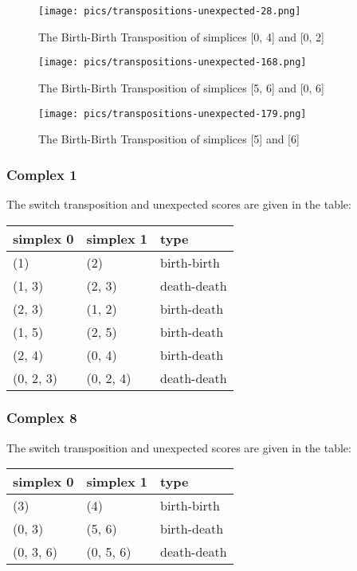 \documentclass{article}
\begin{document}
\begin{figure}[ht]
\centering
\texttt{[image: pics/transpositions-unexpected-28.png]}
\caption{The Birth-Birth Transposition of simplices [0, 4] and [0, 2]}
\label{fig:unexpected28}
\end{figure}

\begin{figure}[ht]
\centering
\texttt{[image: pics/transpositions-unexpected-168.png]}
\caption{The Birth-Birth Transposition of simplices [5, 6] and [0, 6]}
\label{fig:unexpected168}
\end{figure}

\begin{figure}[ht]
\centering
\texttt{[image: pics/transpositions-unexpected-179.png]}
\caption{The Birth-Birth Transposition of simplices [5] and [6]}
\label{fig:unexpected179}
\end{figure}


\subsubsection{Complex 1}
\par The switch transposition and unexpected scores are given in the table:
\begin{center}
\begin{tabular}{lll}
\toprule
simplex 0 & simplex 1 & type \\
\midrule
(1) & (2) & birth-birth \\
(1, 3) & (2, 3) & death-death \\
(2, 3) & (1, 2) & birth-death \\
(1, 5) & (2, 5) & birth-death \\
(2, 4) & (0, 4) & birth-death \\
(0, 2, 3) & (0, 2, 4) & death-death \\
\bottomrule
\end{tabular}
\end{center}


\subsubsection{Complex 8}
\par The switch transposition and unexpected scores are given in the table:
\begin{center}
\begin{tabular}{lll}
\toprule
simplex 0 & simplex 1 & type \\
\midrule
(3) & (4) & birth-birth \\
(0, 3) & (5, 6) & birth-death \\
(0, 3, 6) & (0, 5, 6) & death-death \\
\bottomrule
\end{tabular}
\end{center}
\end{document}
